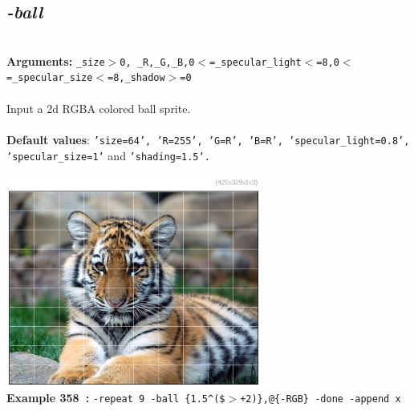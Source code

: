 \documentclass[a4paper,11pt,twoside]{book}
\begin{document}
\subsection{\emph{-ball} }\vspace*{-0.5em}
~\\\textbf{Arguments: } 
{\small \texttt{\_size$>$0, \_R,\_G,\_B,0$<$=\_specular\_light$<$=8,0$<$=\_specular\_size$<$=8,\_shadow$>$=0}}\\~\\
Input a 2d RGBA colored ball sprite.
~\\~\\\textbf{Default values}: {\small \texttt{'size=64', 'R=255', 'G=R', 'B=R', 'specular\_light=0.8', 'specular\_size=1'} and \texttt{'shading=1.5'.}}
\begin{center}\includegraphics[keepaspectratio=true,height=7cm,width=\textwidth]{img/gmic_def358.jpg}\\
{\footnotesize \textbf{Example 358~:} \texttt{-repeat 9 -ball \{1.5\textasciicircum (\$$>$+2)\},@\{-RGB\} -done -append x}}
\end{center}
\end{document}
